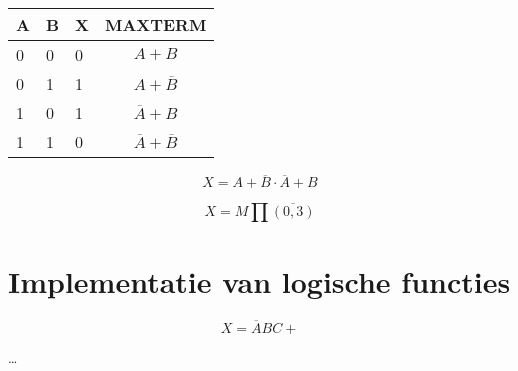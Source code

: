 \documentclass[11pt, a4paper]{report}
\begin{document}
\begin{tabular}{l l l || c}
A & B & X & MAXTERM \\
\hline
0 & 0 & 0 & $A+B$ \\
0 & 1 & 1 & $A+\overline{B}$ \\
1 & 0 & 1 & $\overline{A}+B $\\
1 & 1 & 0 & $\overline{A}+\overline{B}$ \\
\end{tabular}

$$X = A+\overline{B} \cdot \overline{A}+B $$

$$X = M \prod\overline{(0,3)} $$


\section{Implementatie van logische functies}

$$ X = \overline{A}BC + $$

\dots

\newpage
\end{document}
